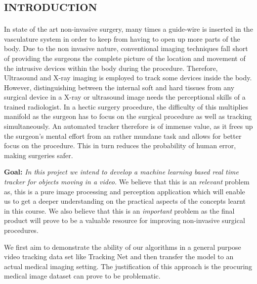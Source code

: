\section{\textsc{introduction}}

In state of the art non-invasive surgery, many times a guide-wire is inserted in the vasculature system in order to keep from having to open up more parts of the body. 
Due to the non invasive nature, conventional imaging techniques fall short of providing the surgeons the complete picture of the location and movement of the intrusive devices within the body during the procedure. 
Therefore, Ultrasound and X-ray imaging is employed to track some devices inside the body. 
However, distinguishing between the internal soft and hard tissues from any surgical device in a X-ray or ultrasound image needs the perceptional skills of a trained radiologist. 
In a hectic surgery procedure, the difficulty of this multiplies manifold as the surgeon has to focus on the surgical procedure as well as tracking simultaneously.
An automated tracker therefore is of immense value, as it frees up the surgeon's mental effort from an rather mundane task and allows for better focus on the procedure.
This in turn reduces the probability of human error, making surgeries safer.

\textbf{Goal:} \textit{In this project we intend to develop a machine learning based real time tracker for objects moving in a video.}
%
We believe that this is an \textit{relevant} problem as, this is a pure image processing and perception application which will enable us to get a deeper understanding on the practical aspects of the concepts learnt in this course. 
We also believe that this is an \textit{important} problem as the final product will prove to be a valuable resource for improving non-invasive surgical procedures.




We first aim to demonstrate the ability of our algorithms in a general purpose video tracking data set like Tracking Net \cite{trackingnet} and then transfer the model to an actual medical imaging setting. 
The justification of this approach is the procuring medical image dataset can prove to be problematic. 

